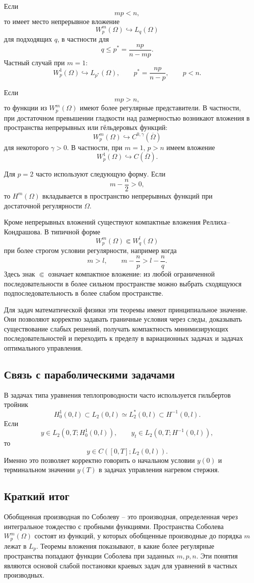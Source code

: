 \documentclass[12pt,a4paper]{article}
\begin{document}
Если
\[
mp<n,
\]
то имеет место непрерывное вложение
\[
W_p^m(\Omega)\hookrightarrow L_q(\Omega)
\]
для подходящих \(q\), в частности для
\[
q\le p^*=\frac{np}{n-mp}.
\]
Частный случай при \(m=1\):
\[
W_p^1(\Omega)\hookrightarrow L_{p^*}(\Omega),
\qquad
p^*=\frac{np}{n-p},
\qquad p<n.
\]

Если
\[
mp>n,
\]
то функции из \(W_p^m(\Omega)\) имеют более регулярные представители. В частности, при достаточном превышении гладкости над размерностью возникают вложения в пространства непрерывных или гёльдеровых функций:
\[
W_p^m(\Omega)\hookrightarrow C^{0,\gamma}(\overline\Omega)
\]
для некоторого \(\gamma>0\). В частности, при \(m=1\), \(p>n\) имеем вложение
\[
W_p^1(\Omega)\hookrightarrow C(\overline\Omega).
\]

Для \(p=2\) часто используют следующую форму. Если
\[
m-\frac n2>0,
\]
то \(H^m(\Omega)\) вкладывается в пространство непрерывных функций при достаточной регулярности \(\Omega\).

Кроме непрерывных вложений существуют компактные вложения Реллиха--Кондрашова. В типичной форме
\[
W_p^m(\Omega)\Subset W_q^l(\Omega)
\]
при более строгом условии регулярности, например когда
\[
m>l,
\qquad
m-\frac np>l-\frac nq.
\]
Здесь знак \(\Subset\) означает компактное вложение: из любой ограниченной последовательности в более сильном пространстве можно выбрать сходящуюся подпоследовательность в более слабом пространстве.

Для задач математической физики эти теоремы имеют принципиальное значение. Они позволяют корректно задавать граничные условия через следы, доказывать существование слабых решений, получать компактность минимизирующих последовательностей и переходить к пределу в вариационных задачах и задачах оптимального управления.

\subsection*{Связь с параболическими задачами}
В задачах типа уравнения теплопроводности часто используется гильбертов тройник
\[
H_0^1(0,l)\subset L_2(0,l)\simeq L_2^*(0,l)\subset H^{-1}(0,l).
\]
Если
\[
y\in L_2(0,T;H_0^1(0,l)),
\qquad
y_t\in L_2(0,T;H^{-1}(0,l)),
\]
то
\[
y\in C([0,T];L_2(0,l)).
\]
Именно это позволяет корректно говорить о начальном условии \(y(0)\) и терминальном значении \(y(T)\) в задачах управления нагревом стержня.

\subsection*{Краткий итог}
Обобщенная производная по Соболеву -- это производная, определенная через интегральное тождество с пробными функциями. Пространства Соболева \(W_p^m(\Omega)\) состоят из функций, у которых обобщенные производные до порядка \(m\) лежат в \(L_p\). Теоремы вложения показывают, в какие более регулярные пространства попадают функции Соболева при заданных \(m,p,n\). Эти понятия являются основой слабой постановки краевых задач для уравнений в частных производных.
\end{document}
